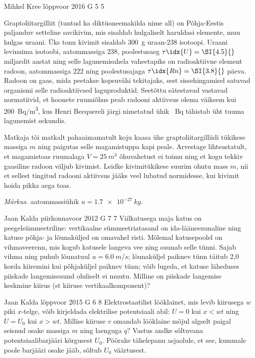 \documentclass[11pt, twoside]{article}
\begin{document}
{%
{Mihkel Kree} %
{lõppvoor} %
{2016} %
{G 5} %
{5} %
{
\ifStatement
Graptoliitargilliit (tuntud ka diktüoneemakilda nime all) on Põhja-Eestis paljanduv setteline savikivim, mis sisaldab hulgaliselt haruldasi elemente, muu hulgas uraani. Üks tonn kivimit sisaldab \SI{300}{g} uraan-238 isotoopi. Uraani levinuima isotoobi, aatommassiga $238$, poolestusaeg $\tau\idx{U}=\SI{4.5}{}$ miljardit aastat ning selle lagunemisahela vaheetapiks on radioaktiivne element radoon, aatommassiga $222$ ning poolestusajaga $\tau\idx{Rn}=\SI{3.8}{}$ päeva. Radoon on gaas, mida peetakse kopsuvähi tekitajaks, sest sissehingamisel satuvad organismi selle radioaktiivsed laguproduktid. Seetõttu sätestavad vastavad normatiivid, et hoonete ruumiõhus peab radooni aktiivsus olema väiksem kui \SI{200}{Bq/m^3}, kus	Henri Becquereli järgi nimetatud ühik \SI{}{Bq} tähistab üht tuuma lagunemist sekundis.

Matkaja tõi matkalt pahaaimamatult koju kaasa ühe graptoliitargilliidi tükikese massiga $m$ ning paigutas selle magamistuppa kapi peale. Arvestage lihtsustatult, et magamistoas ruumalaga $V=\SI{25}{m^3}$ õhuvahetust ei toimu ning et kogu tekkiv gaasiline radoon väljub kivimist. Leidke kivimitükikese suurim ohutu mass $m$, nii et sellest tingitud radooni aktiivsus jääks veel lubatud normidesse, kui kivimit hoida pikka aega toas. 

\emph{Märkus.} aatommassiühik $u=\SI{1.7e-27}{kg}$.
\fi
}

{Jaan Kalda} %
{piirkonnavoor} %
{2012} %
{G 7} %
{7} %
{
\ifStatement
Viilkatusega maja katus on peegelsümmeetriline: vertikaalne sümmeetriatasand on
ida-läänesuunaline ning katuse
põhja- ja lõunaküljed on omavahel risti. Mõlemal katusepoolel on vihmaveerenn,
mis kogub katusele langeva vee ning suunab selle tünni.
Sajab vihma ning puhub lõunatuul $u= \SI{6,0}{m/s}$; lõunaküljel paiknev tünn
täitub 2,0 korda kiiremini kui põhjaküljel paiknev tünn; võib
lugeda, et katuse läheduses piiskade langemissuund oluliselt ei muutu.
Milline on piiskade langemise keskmine kiirus (st kiiruse vertikaalkomponent)?
\fi
}

{Jaan Kalda} %
{lõppvoor} %
{2015} %
{G 6} %
{8} %
{
\ifStatement
Elektrostaatilist lööklainet, mis levib kiirusega $w$ piki $x$-telge, võib kirjeldada elektrilise potentsiaali abil: $U=0$ kui $x<wt$ ning $U=U_0$ kui $x>wt$. Millise kiiruse $v$ omandab lööklaine mõjul algselt paigal seisnud osake massiga $m$ ning laenguga $q$? Vastus andke sõltuvana potentsiaalibarjääri kõrgusest $U_0$. Pöörake tähelepanu asjaolule, et see, kummale poole barjääri osake jääb, sõltub $U_0$ väärtusest. 
\fi
}

}
\end{document}

